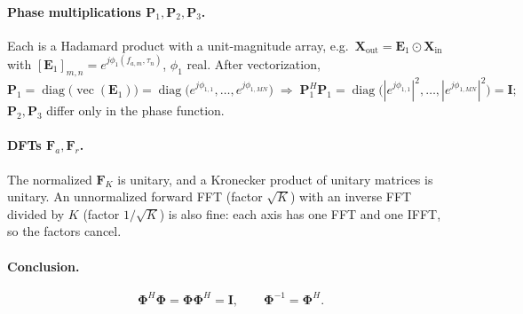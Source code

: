 \documentclass[11pt,a4paper]{article}
\newcommand{\bPhi}{\boldsymbol\Phi}
\DeclareMathOperator{\vect}{vec}
\DeclareMathOperator{\diag}{diag}
\begin{document}
\paragraph{Phase multiplications $\mathbf P_1, \mathbf P_2, \mathbf P_3$.} Each is a Hadamard product with a unit-magnitude array,
e.g.\ $\mathbf X_{\mathrm{out}} = \mathbf E_1 \odot \mathbf X_{\mathrm{in}}$ with $[\mathbf E_1]_{m,n} = e^{j\phi_1(f_{a,m},\tau_n)}$, $\phi_1$ real.
After vectorization,
\begin{equation}
  \mathbf P_1 = \diag\bigl(\vect(\mathbf E_1)\bigr) = \diag\bigl(e^{j\phi_{1,1}}, \dots, e^{j\phi_{1,MN}}\bigr)
  \;\Rightarrow\;
  \mathbf P_1^H\mathbf P_1 = \diag\bigl(|e^{j\phi_{1,1}}|^2, \dots, |e^{j\phi_{1,MN}}|^2\bigr) = \mathbf I ;
\end{equation}
$\mathbf P_2, \mathbf P_3$ differ only in the phase function.

\paragraph{DFTs $\mathbf F_a, \mathbf F_r$.} The normalized $\mathbf F_K$ is unitary, and a Kronecker product of unitary matrices is unitary.
An unnormalized forward FFT (factor $\sqrt K$) with an inverse FFT divided by $K$ (factor $1/\sqrt K$) is also fine:
each axis has one FFT and one IFFT, so the factors cancel.

\paragraph{Conclusion.}
\begin{equation}\label{eq:unitary}
  \bPhi^H\bPhi = \bPhi\bPhi^H = \mathbf I, \qquad \bPhi^{-1} = \bPhi^H .
\end{equation}
\end{document}
